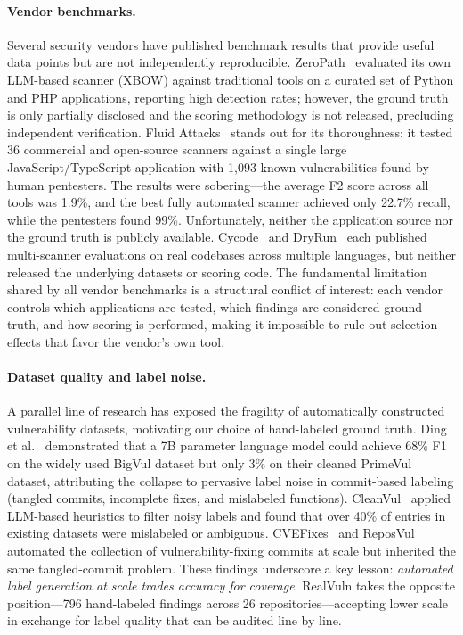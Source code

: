 \paragraph{Vendor benchmarks.}
Several security vendors have published benchmark results that provide useful
data points but are not independently reproducible. ZeroPath~\cite{zeropath2024}
evaluated its own LLM-based scanner (XBOW) against traditional tools on a
curated set of Python and PHP applications, reporting high detection rates;
however, the ground truth is only partially disclosed and the scoring
methodology is not released, precluding independent verification.
Fluid Attacks~\cite{fluidattacks2025} stands out for its thoroughness: it
tested 36 commercial and open-source scanners against a single large
JavaScript/TypeScript application with 1{,}093 known vulnerabilities found by
human pentesters. The results were sobering---the average F2 score across all
tools was 1.9\%, and the best fully automated scanner achieved only 22.7\%
recall, while the pentesters found 99\%. Unfortunately, neither the application
source nor the ground truth is publicly available. Cycode~\cite{cycode2024benchmark}
and DryRun~\cite{dryrun2025sast} each published multi-scanner evaluations on
real codebases across multiple languages, but neither released the underlying
datasets or scoring code. The fundamental limitation shared by all vendor
benchmarks is a structural conflict of interest: each vendor controls which
applications are tested, which findings are considered ground truth, and how
scoring is performed, making it impossible to rule out selection effects that
favor the vendor's own tool.

\paragraph{Dataset quality and label noise.}
A parallel line of research has exposed the fragility of automatically
constructed vulnerability datasets, motivating our choice of hand-labeled
ground truth. Ding et al.~\cite{ding2024primevul} demonstrated that a 7B
parameter language model could achieve 68\% F1 on the widely used BigVul
dataset but only 3\% on their cleaned PrimeVul dataset, attributing the
collapse to pervasive label noise in commit-based labeling (tangled commits,
incomplete fixes, and mislabeled functions). CleanVul~\cite{li2025cleanvul}
applied LLM-based heuristics to filter noisy labels and found that over 40\%
of entries in existing datasets were mislabeled or ambiguous.
CVEFixes~\cite{bhandari2021cvefixes} and ReposVul~\cite{wang2024reposvul}
automated the collection of vulnerability-fixing commits at scale but
inherited the same tangled-commit problem. These findings underscore a key
lesson: \emph{automated label generation at scale trades accuracy for
coverage}. RealVuln takes the opposite position---796 hand-labeled findings
across 26 repositories---accepting lower scale in exchange for label quality
that can be audited line by line.

